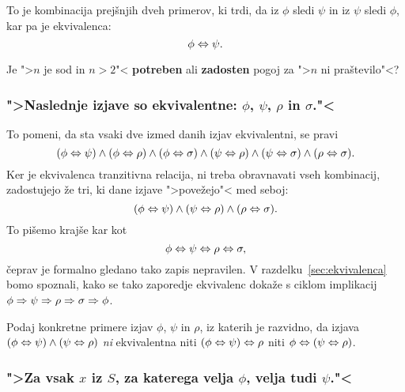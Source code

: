 To je kombinacija prejšnjih dveh primerov, ki trdi, da iz $\phi$ sledi
$\psi$ in iz $\psi$ sledi $\phi$, kar pa je ekvivalenca:
%
\begin{equation*}
  \phi \Leftrightarrow \psi.
\end{equation*}

\begin{vaja}
  Je ">$n$ je sod in $n > 2$"< \textbf{potreben} ali \textbf{zadosten}
  pogoj za ">$n$ ni praštevilo"<?
\end{vaja}


\subsubsection{">Naslednje izjave so ekvivalentne: $\phi$, $\psi$, $\rho$ in $\sigma$."<}

To pomeni, da sta vsaki dve izmed danih izjav ekvivalentni, se pravi
%
\begin{equation*}
  (\phi \Leftrightarrow \psi) \land (\phi \Leftrightarrow \rho) \land (\phi \Leftrightarrow \sigma) \land (\psi \Leftrightarrow \rho)
  \land (\psi \Leftrightarrow \sigma) \land (\rho \Leftrightarrow \sigma).
\end{equation*}
%
Ker je ekvivalenca tranzitivna relacija, ni treba obravnavati vseh
kombinacij, zadostujejo že tri, ki dane izjave ">povežejo"< med seboj:
%
\begin{equation*}
  (\phi \Leftrightarrow \psi) \land (\psi \Leftrightarrow \rho) \land (\rho \Leftrightarrow \sigma).
\end{equation*}
%
To pišemo krajše kar kot
%
\begin{equation*}
  \phi \Leftrightarrow \psi \Leftrightarrow \rho \Leftrightarrow \sigma,
\end{equation*}
%
čeprav je formalno gledano tako zapis nepravilen. V
razdelku~\ref{sec:ekvivalenca} bomo spoznali, kako se tako zaporedje
ekvivalenc dokaže s ciklom implikacij $\phi \Rightarrow \psi \Rightarrow \rho
\Rightarrow \sigma \Rightarrow \phi$.

\begin{vaja}
  Podaj konkretne primere izjav $\phi$, $\psi$ in $\rho$, iz katerih
  je razvidno, da izjava $(\phi \Leftrightarrow \psi) \land (\psi \Leftrightarrow \rho)$
  \emph{ni} ekvivalentna niti $(\phi \Leftrightarrow \psi) \Leftrightarrow \rho$ niti
  $\phi \Leftrightarrow (\psi \Leftrightarrow \rho)$.
\end{vaja}



\subsubsection{">Za vsak $x$ iz $S$, za katerega velja $\phi$, velja tudi
  $\psi$."<}


